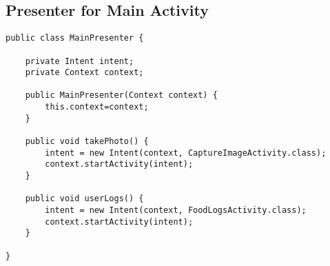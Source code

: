 \subsection*{Presenter for Main Activity}
\begin{lstlisting}[style=Java]
public class MainPresenter {

    private Intent intent;
    private Context context;

    public MainPresenter(Context context) {
        this.context=context;
    }

    public void takePhoto() {
        intent = new Intent(context, CaptureImageActivity.class);
        context.startActivity(intent);
    }

    public void userLogs() {
        intent = new Intent(context, FoodLogsActivity.class);
        context.startActivity(intent);
    }

}
\end{lstlisting}

